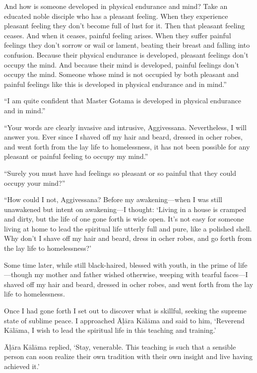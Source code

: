 \documentclass[12pt,openany]{book}%
\begin{document}
And how is someone developed in physical endurance and mind? Take an educated noble disciple who has a pleasant feeling. When they experience pleasant feeling they don’t become full of lust for it. Then that pleasant feeling ceases. And when it ceases, painful feeling arises. When they suffer painful feelings they don’t sorrow or wail or lament, beating their breast and falling into confusion. Because their physical endurance is developed, pleasant feelings don’t occupy the mind. And because their mind is developed, painful feelings don’t occupy the mind. Someone whose mind is not occupied by both pleasant and painful feelings like this is developed in physical endurance and in mind.” 

“I am quite confident that Master Gotama is developed in physical endurance and in mind.” 

“Your words are clearly invasive and intrusive, Aggivessana. Nevertheless, I will answer you. Ever since I shaved off my hair and beard, dressed in ocher robes, and went forth from the lay life to homelessness, it has not been possible for any pleasant or painful feeling to occupy my mind.” 

“Surely you must have had feelings so pleasant or so painful that they could occupy your mind?” 

“How could I not, Aggivessana? Before my awakening—when I was still unawakened but intent on awakening—I thought: ‘Living in a house is cramped and dirty, but the life of one gone forth is wide open. It’s not easy for someone living at home to lead the spiritual life utterly full and pure, like a polished shell. Why don’t I shave off my hair and beard, dress in ocher robes, and go forth from the lay life to homelessness?’ 

Some time later, while still black-haired, blessed with youth, in the prime of life—though my mother and father wished otherwise, weeping with tearful faces—I shaved off my hair and beard, dressed in ocher robes, and went forth from the lay life to homelessness. 

Once I had gone forth I set out to discover what is skillful, seeking the supreme state of sublime peace. I approached \textsanskrit{Āḷāra} \textsanskrit{Kālāma} and said to him, ‘Reverend \textsanskrit{Kālāma}, I wish to lead the spiritual life in this teaching and training.’ 

\textsanskrit{Āḷāra} \textsanskrit{Kālāma} replied, ‘Stay, venerable. This teaching is such that a sensible person can soon realize their own tradition with their own insight and live having achieved it.’ 
\end{document}
